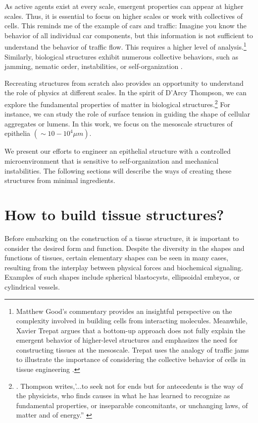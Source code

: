 As active agents exist at every scale, emergent properties can appear at higher scales. Thus, it is essential to focus on higher scales or work with collectives of cells. This reminds me of the example of cars and traffic: Imagine you know the behavior of all individual car components, but this information is not sufficient to understand the behavior of traffic flow. This requires a higher level of analysis.\footnote{Matthew Good's commentary provides an insightful perspective on the complexity involved in building cells from interacting molecules. Meanwhile, Xavier Trepat argues that a bottom-up approach does not fully explain the emergent behavior of higher-level structures and emphasizes the need for constructing tissues at the mesoscale. Trepat uses the analogy of traffic jams to illustrate the importance of considering the collective behavior of cells in tissue engineering \cite{good2018}.} 
Similarly, biological structures exhibit numerous collective behaviors, such as jamming, nematic order, instabilities, or self-organization \cite{trepat2018}. 

Recreating structures from scratch also provides an opportunity to understand the role of physics at different scales. In the spirit of D'Arcy Thompson, we can explore the fundamental properties of matter in biological structures.\footnote{. Thompson writes,’...to seek not for ends but for antecedents is the way of the physicists, who finds causes in what he has learned to recognize as fundamental properties, or inseparable concomitants, or unchanging laws, of matter and of energy.” \cite{thompson1979}}
For instance, we can study the role of surface tension in guiding the shape of cellular aggregates or lumens. In this work, we focus on the mesoscale structures of epithelia \((\sim 10-10^4 \mu m)\).  

We present our efforts to engineer an epithelial structure with a controlled microenvironment that is sensitive to self-organization and mechanical instabilities. The following sections will describe the ways of creating these structures from minimal ingredients.

\hypertarget{how-to-build-tissue-structures}{%
	\section{How to build tissue 		structures?}\label{how-to-build-tissue-structures}}

Before embarking on the construction of a tissue structure, it is important to consider the desired form and function. Despite the diversity in the shapes and functions of tissues, certain elementary shapes can be seen in many cases, resulting from the interplay between physical forces and biochemical signaling. Examples of such shapes include spherical blastocysts, ellipsoidal embryos, or cylindrical vessels.

